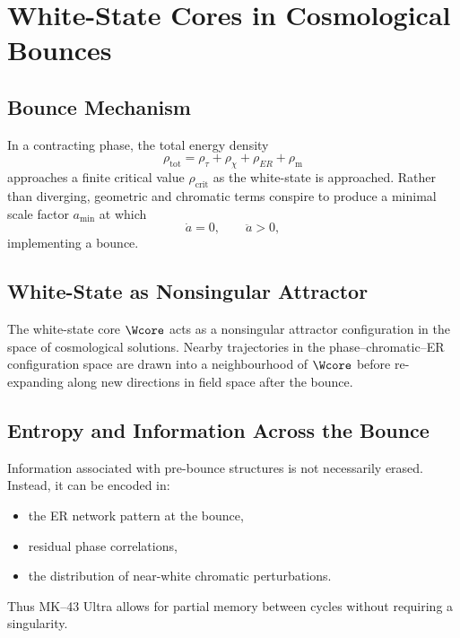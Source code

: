 \chapter{White-State Cores in Cosmological Bounces}

\section{Bounce Mechanism}

In a contracting phase, the total energy density
\[
  \rho_{\mathrm{tot}} = \rho_\tau + \rho_\chi + \rho_{ER} + \rho_{\mathrm{m}}
\]
approaches a finite critical value $\rho_{\mathrm{crit}}$ as the white-state is approached.
Rather than diverging, geometric and chromatic terms conspire to produce a minimal scale factor $a_{\mathrm{min}}$ at which
\[
  \dot{a} = 0, \qquad \ddot{a} > 0,
\]
implementing a bounce.

\section{White-State as Nonsingular Attractor}

The white-state core $\Wcore$ acts as a nonsingular attractor configuration in the space of cosmological solutions.
Nearby trajectories in the phase--chromatic--ER configuration space are drawn into a neighbourhood of $\Wcore$ before re-expanding along new directions in field space after the bounce.

\section{Entropy and Information Across the Bounce}

Information associated with pre-bounce structures is not necessarily erased.
Instead, it can be encoded in:

\begin{itemize}
  \item the ER network pattern at the bounce,
  \item residual phase correlations,
  \item the distribution of near-white chromatic perturbations.
\end{itemize}

Thus MK--43 Ultra allows for partial memory between cycles without requiring a singularity.

